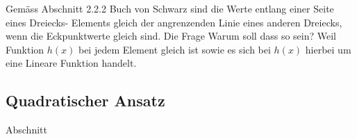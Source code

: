 Gemäss Abschnitt 2.2.2 Buch von Schwarz sind die Werte entlang einer Seite eines Dreiecks- Elements gleich  der angrenzenden Linie eines anderen Dreiecks, wenn die Eckpunktwerte gleich sind. Die Frage Warum soll dass so sein? Weil Funktion $h(x)$ bei jedem Element gleich ist sowie es sich bei $h(x)$ hierbei um eine Lineare Funktion handelt.

\subsection{Quadratischer Ansatz
\label{fem:subsection:bonorum}}
 Abschnitt 
